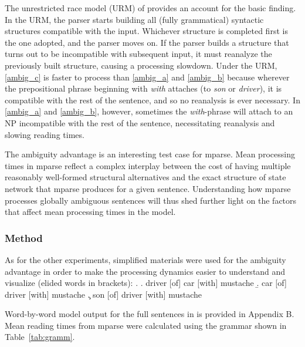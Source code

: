 \documentclass[a4paper, 12pt]{article}
\begin{document}
The unrestricted race model (URM) of \citet{vangompel2000unrestricted} provides an
account for the basic finding. In the URM, the parser starts building all
(fully grammatical) syntactic structures compatible with the input. Whichever
structure is completed first is the one adopted, and the parser moves on. If
the parser builds a structure that turns out to be incompatible with subsequent
input, it must reanalyze the previously built structure, causing a processing
slowdown.  Under the URM, \ref{ambig_c} is faster to process than \ref{ambig_a}
and \ref{ambig_b} because wherever the prepositional phrase beginning with
\emph{with} attaches (to \emph{son} or \emph{driver}), it is compatible with
the rest of the sentence, and so no reanalysis is ever necessary. In
\ref{ambig_a} and \ref{ambig_b}, however, sometimes the \emph{with}-phrase will attach to
an NP incompatible with the rest of the sentence, necessitating reanalysis and
slowing reading times.

The ambiguity advantage is an interesting test case for mparse. Mean processing
times in mparse reflect a complex interplay between the cost of having multiple
reasonably well-formed structural alternatives and the exact structure of state
network that mparse produces for a given sentence. Understanding how mparse
processes globally ambiguous sentences will thus shed further light on the
factors that affect mean processing times in the model.

\subsubsection{Method}
As for the other experiments, simplified materials were used for the ambiguity
advantage in order to make the processing dynamics easier to understand and
visualize (elided words in brackets): \ex. \label{ex:aashort} \a.
\label{aahighshort} driver [of] car [with] mustache \b. \label{aalowshort} car
[of] driver [with] mustache \c. \label{aaambshort} son [of] driver [with]
mustache 

Word-by-word model output for the full sentences in \LLast is provided in
Appendix B. Mean reading times from mparse were calculated using the grammar
shown in Table~\ref{tab:gramm}. 
\end{document}

